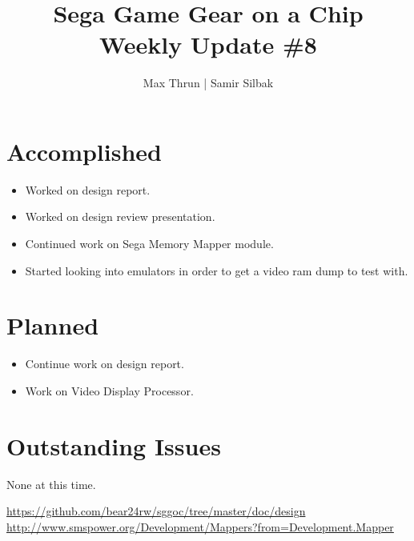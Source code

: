 \documentclass[12pt]{article}
\title{Sega Game Gear on a Chip \\ Weekly Update \#8}
\author{ Max Thrun | Samir Silbak }
\begin{document}
\maketitle

\section*{Accomplished}
\begin{itemize}
    \item Worked on design report. \cite{report}
    \item Worked on design review presentation.
    \item Continued work on Sega Memory Mapper module. \cite{mapper}
    \item Started looking into emulators in order to get a video ram dump to test with.
\end{itemize}

\section*{Planned}
\begin{itemize}
    \item Continue work on design report.
    \item Work on Video Display Processor.
\end{itemize}

\section*{Outstanding Issues}
None at this time.

\vspace{.1in}
\begin{thebibliography}{9}
     \url{https://github.com/bear24rw/sggoc/tree/master/doc/design}
     \url{http://www.smspower.org/Development/Mappers?from=Development.Mapper}
\end{thebibliography}
\end{document}
